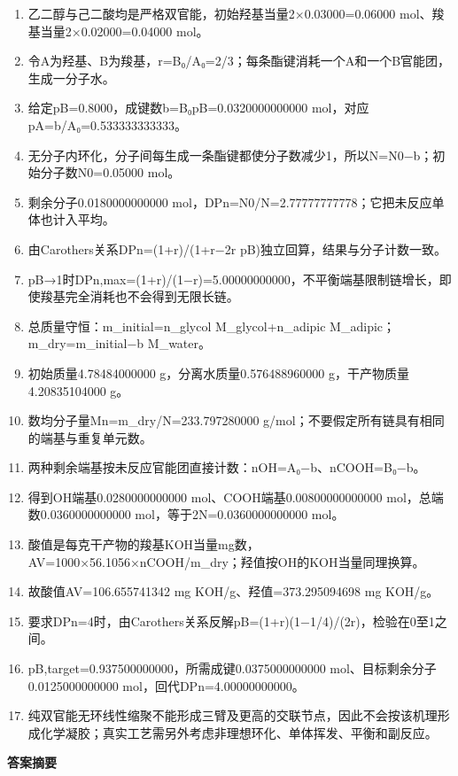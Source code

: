 \documentclass[UTF8,11pt,a4paper]{ctexart}
\begin{document}
\begin{enumerate}
\item 乙二醇与己二酸均是严格双官能，初始羟基当量2×0.03000=0.06000 mol、羧基当量2×0.02000=0.04000 mol。
\item 令A为羟基、B为羧基，r=B₀/A₀=2/3；每条酯键消耗一个A和一个B官能团，生成一分子水。
\item 给定pB=0.8000，成键数b=B₀pB=0.0320000000000 mol，对应pA=b/A₀=0.533333333333。
\item 无分子内环化，分子间每生成一条酯键都使分子数减少1，所以N=N0−b；初始分子数N0=0.05000 mol。
\item 剩余分子0.0180000000000 mol，DPn=N0/N=2.77777777778；它把未反应单体也计入平均。
\item 由Carothers关系DPn=(1+r)/(1+r−2r pB)独立回算，结果与分子计数一致。
\item pB→1时DPn,max=(1+r)/(1−r)=5.00000000000，不平衡端基限制链增长，即使羧基完全消耗也不会得到无限长链。
\item 总质量守恒：m\_initial=n\_glycol M\_glycol+n\_adipic M\_adipic；m\_dry=m\_initial−b M\_water。
\item 初始质量4.78484000000 g，分离水质量0.576488960000 g，干产物质量4.20835104000 g。
\item 数均分子量Mn=m\_dry/N=233.797280000 g/mol；不要假定所有链具有相同的端基与重复单元数。
\item 两种剩余端基按未反应官能团直接计数：nOH=A₀−b、nCOOH=B₀−b。
\item 得到OH端基0.0280000000000 mol、COOH端基0.00800000000000 mol，总端数0.0360000000000 mol，等于2N=0.0360000000000 mol。
\item 酸值是每克干产物的羧基KOH当量mg数，AV=1000×56.1056×nCOOH/m\_dry；羟值按OH的KOH当量同理换算。
\item 故酸值AV=106.655741342 mg KOH/g、羟值=373.295094698 mg KOH/g。
\item 要求DPn=4时，由Carothers关系反解pB=(1+r)(1−1/4)/(2r)，检验在0至1之间。
\item pB,target=0.937500000000，所需成键0.0375000000000 mol、目标剩余分子0.0125000000000 mol，回代DPn=4.00000000000。
\item 纯双官能无环线性缩聚不能形成三臂及更高的交联节点，因此不会按该机理形成化学凝胶；真实工艺需另外考虑非理想环化、单体挥发、平衡和副反应。
\end{enumerate}
\noindent\textbf{答案摘要}\par
\end{document}
